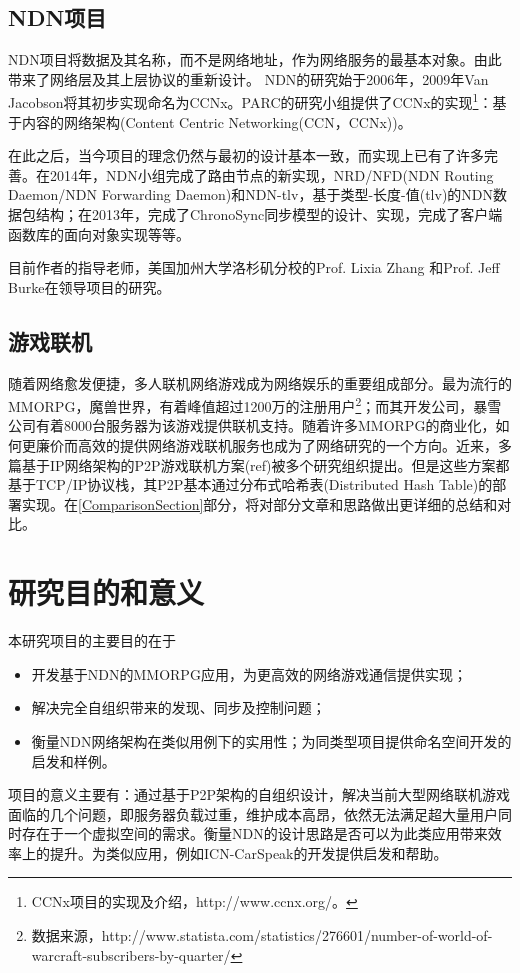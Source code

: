 \subsection{NDN项目}
\par
NDN项目将数据及其名称，而不是网络地址，作为网络服务的最基本对象。由此带来了网络层及其上层协议的重新设计。
NDN的研究始于2006年，2009年Van Jacobson将其初步实现命名为CCNx\cite{NDNRefOriginal}。PARC的研究小组提供了CCNx的实现\footnote{CCNx项目的实现及介绍，http://www.ccnx.org/。}：基于内容的网络架构(Content Centric Networking(CCN，CCNx))。
\par
在此之后，当今项目的理念仍然与最初的设计基本一致，而实现上已有了许多完善。在2014年，NDN小组完成了路由节点的新实现，NRD/NFD(NDN Routing Daemon/NDN Forwarding Daemon)和NDN-tlv，基于类型-长度-值(tlv)的NDN数据包结构；在2013年，完成了ChronoSync同步模型的设计、实现，完成了客户端函数库的面向对象实现等等。
\par
目前作者的指导老师，美国加州大学洛杉矶分校的Prof. Lixia Zhang 和Prof. Jeff Burke在领导项目的研究。
\subsection{游戏联机}
\par
随着网络愈发便捷，多人联机网络游戏成为网络娱乐的重要组成部分。最为流行的MMORPG，魔兽世界，有着峰值超过1200万的注册用户\footnote{数据来源，http://www.statista.com/statistics/276601/number-of-world-of-warcraft-subscribers-by-quarter/}；而其开发公司，暴雪公司有着8000台服务器为该游戏提供联机支持。随着许多MMORPG的商业化，如何更廉价而高效的提供网络游戏联机服务也成为了网络研究的一个方向。近来，多篇基于IP网络架构的P2P游戏联机方案(ref)被多个研究组织提出。但是这些方案都基于TCP/IP协议栈，其P2P基本通过分布式哈希表(Distributed Hash Table)的部署实现。在\ref{ComparisonSection}部分，将对部分文章和思路做出更详细的总结和对比。
\section{研究目的和意义}
\par
本研究项目的主要目的在于
\begin{itemize}
\item
开发基于NDN的MMORPG应用，为更高效的网络游戏通信提供实现；
\item
解决完全自组织带来的发现、同步及控制问题；
\item
衡量NDN网络架构在类似用例下的实用性；为同类型项目提供命名空间开发的启发和样例。
\end{itemize}
\par
项目的意义主要有：通过基于P2P架构的自组织设计，解决当前大型网络联机游戏面临的几个问题，即服务器负载过重，维护成本高昂，依然无法满足超大量用户同时存在于一个虚拟空间的需求。衡量NDN的设计思路是否可以为此类应用带来效率上的提升。为类似应用，例如ICN-CarSpeak\cite{V2VUseCaseRef}的开发提供启发和帮助。
